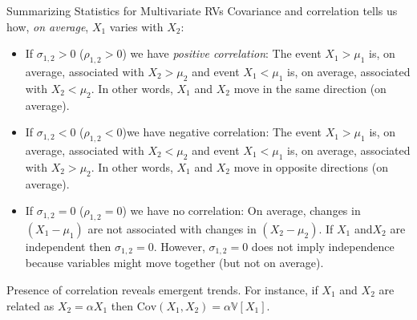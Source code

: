 \documentclass[handout,9pt]{beamer}
\begin{document}
%
\begin{frame}{Summarizing Statistics for Multivariate RVs}
Covariance and correlation tells us how, {\em on average}, $X_1$ varies with $X_2$: 

\begin{block}{}
\begin{itemize}
\setlength{\itemsep}{10pt}
\item If $\sigma_{1,2}>0$ ($\rho_{1,2}>0$) we have {\em positive correlation}: The event $X_1>\mu_1$  is, on average, associated with $X_2>\mu_2$ and event $X_1<\mu_1$  is, on average, associated with $X_2<\mu_2$.  In other words, $X_1$ and $X_2$ move in the same direction (on average).

\item If $\sigma_{1,2}<0$  ($\rho_{1,2}<0$)we have negative correlation: The event $X_1>\mu_1$  is, on average, associated with $X_2<\mu_2$ and event $X_1<\mu_1$  is, on average, associated with $X_2>\mu_2$. In other words, $X_1$ and $X_2$ move in opposite directions (on average). 

\item If $\sigma_{1,2}=0$ ($\rho_{1,2}=0$) we have no correlation: On average, changes in $(X_1-\mu_1)$ are not associated with changes in $(X_2-\mu_2)$. If $X_1$ and$X_2$ are independent then $\sigma_{1,2}=0$. However, $\sigma_{1,2}=0$ does not imply independence because variables might move together (but not on average).
\end{itemize}
\end{block}
Presence of correlation reveals emergent trends. For instance, if $X_1$ and $X_2$ are related as $X_2=\alpha X_1$ then $\textrm{Cov}(X_1,X_2)=\alpha \mathbb{V}[X_1]$. 

\end{frame}
\end{document}
